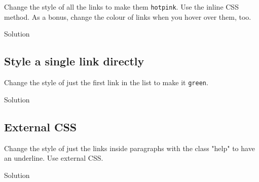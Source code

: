 \documentclass[
  oneside]{book}
\newenvironment{Shaded}{\begin{snugshade}}{\end{snugshade}}
\newcommand{\AttributeTok}[1]{\textcolor[rgb]{0.77,0.63,0.00}{#1}}
\newcommand{\FunctionTok}[1]{\textcolor[rgb]{0.00,0.00,0.00}{#1}}
\newcommand{\NormalTok}[1]{#1}
\newcommand{\SpecialCharTok}[1]{\textcolor[rgb]{0.00,0.00,0.00}{#1}}
\newcommand{\StringTok}[1]{\textcolor[rgb]{0.31,0.60,0.02}{#1}}
\begin{document}
Change the style of all the links to make them \texttt{hotpink}. Use the inline CSS method. As a bonus, change the colour of links when you hover over them, too.

Solution

\begin{Shaded}
\end{Shaded}

\hypertarget{style-a-single-link-directly}{%
\subsection{Style a single link directly}\label{style-a-single-link-directly}}

Change the style of just the first link in the list to make it \texttt{green}.

Solution

\begin{Shaded}
\end{Shaded}

\hypertarget{external-css-1}{%
\subsection{External CSS}\label{external-css-1}}

Change the style of just the links inside paragraphs with the \AttributeTok{class} \StringTok{"help"} to have an underline. Use external CSS.

Solution
\end{document}
